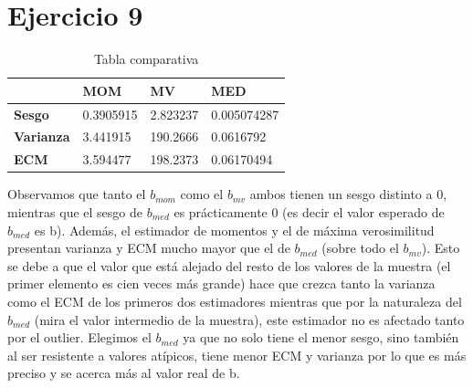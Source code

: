 \documentclass{article}
\begin{document}
\newpage

\section{Ejercicio 9}
\newline

\begin{table}[h!]
\centering
\caption{Tabla comparativa}
\label{my-label}
\begin{tabular}{llll}
\hline
\multicolumn{1}{|l|}{}                  & \multicolumn{1}{l|}{\textbf{MOM}} & \multicolumn{1}{l|}{\textbf{MV}} & \multicolumn{1}{l|}{\textbf{MED}} \\ \hline
\multicolumn{1}{|l|}{\textbf{Sesgo}}    & \multicolumn{1}{l|}{0.3905915}   & \multicolumn{1}{l|}{2.823237}   & \multicolumn{1}{l|}{0.005074287}    \\ \hline
\multicolumn{1}{|l|}{\textbf{Varianza}} & \multicolumn{1}{l|}{3.441915}     & \multicolumn{1}{l|}{190.2666}    & \multicolumn{1}{l|}{0.0616792}   \\ \hline
\multicolumn{1}{|l|}{\textbf{ECM}}      & \multicolumn{1}{l|}{3.594477}     & \multicolumn{1}{l|}{198.2373}    & \multicolumn{1}{l|}{0.06170494}    \\ \hline

\end{tabular}
\end{table}
Observamos que tanto el $b_{mom}$ como el $b_{mv}$ ambos tienen un sesgo distinto a 0, mientras que el sesgo de $b_{med}$ es prácticamente 0 (es decir el valor esperado de $b_{med}$ es b). Además, el estimador de momentos y el de máxima verosimilitud presentan varianza y ECM mucho mayor que el de $b_{med}$ (sobre todo el $b_{mv}$). Esto se debe a que el valor que está alejado del resto de los valores de la muestra (el primer elemento es cien veces más grande) hace que crezca tanto la varianza como el ECM de los primeros dos estimadores mientras que por la naturaleza del $b_{med}$ (mira el valor intermedio de la muestra), este estimador no es afectado tanto por el outlier. Elegimos el $b_{med}$ ya que no solo tiene el menor sesgo, sino también al ser resistente a valores atípicos, tiene menor ECM y varianza por lo que es más preciso y se acerca más al valor real de b.
\end{document}
